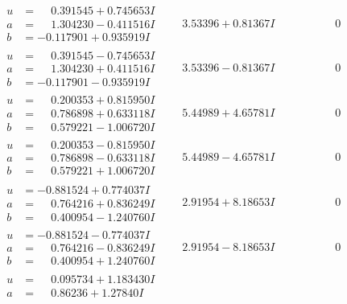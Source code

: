 \documentclass[1p]{elsarticle_modified}
\theoremstyle{definition}
\begin{document}
$$\begin{array}{c|c|c}
\begin{aligned}
u &= \phantom{-}0.391545 + 0.745653 I \\
a &= \phantom{-}1.304230 - 0.411516 I \\
b &= -0.117901 + 0.935919 I\end{aligned}
 & \phantom{-}3.53396 + 0.81367 I & \phantom{-0.000000 } 0 \\ \hline\begin{aligned}
u &= \phantom{-}0.391545 - 0.745653 I \\
a &= \phantom{-}1.304230 + 0.411516 I \\
b &= -0.117901 - 0.935919 I\end{aligned}
 & \phantom{-}3.53396 - 0.81367 I & \phantom{-0.000000 } 0 \\ \hline\begin{aligned}
u &= \phantom{-}0.200353 + 0.815950 I \\
a &= \phantom{-}0.786898 + 0.633118 I \\
b &= \phantom{-}0.579221 - 1.006720 I\end{aligned}
 & \phantom{-}5.44989 + 4.65781 I & \phantom{-0.000000 } 0 \\ \hline\begin{aligned}
u &= \phantom{-}0.200353 - 0.815950 I \\
a &= \phantom{-}0.786898 - 0.633118 I \\
b &= \phantom{-}0.579221 + 1.006720 I\end{aligned}
 & \phantom{-}5.44989 - 4.65781 I & \phantom{-0.000000 } 0 \\ \hline\begin{aligned}
u &= -0.881524 + 0.774037 I \\
a &= \phantom{-}0.764216 + 0.836249 I \\
b &= \phantom{-}0.400954 - 1.240760 I\end{aligned}
 & \phantom{-}2.91954 + 8.18653 I & \phantom{-0.000000 } 0 \\ \hline\begin{aligned}
u &= -0.881524 - 0.774037 I \\
a &= \phantom{-}0.764216 - 0.836249 I \\
b &= \phantom{-}0.400954 + 1.240760 I\end{aligned}
 & \phantom{-}2.91954 - 8.18653 I & \phantom{-0.000000 } 0 \\ \hline\begin{aligned}
u &= \phantom{-}0.095734 + 1.183430 I \\
a &= \phantom{-}0.86236 + 1.27840 I \\

\end{aligned}
\end{array}$$
\end{document}

